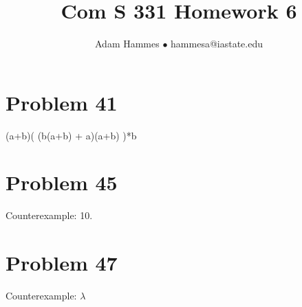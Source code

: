 \documentclass[11pt]{article}
\begin{document}
\title{Com S 331 Homework 6}
\author{Adam Hammes $\bullet$ hammesa@iastate.edu}
\maketitle

\section*{Problem 41}

(a+b)( (b(a+b) + a)(a+b) )*b

\section*{Problem 45}

Counterexample: 10.

\section*{Problem 47}

Counterexample: $\lambda$
\end{document}
